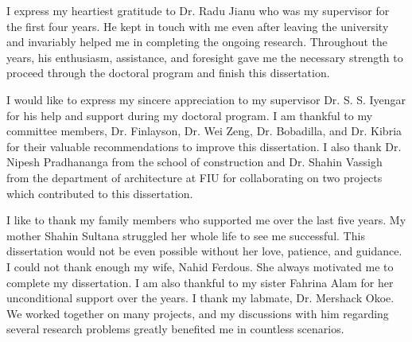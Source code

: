 \begin{acknowledgments}
I express my heartiest gratitude to Dr. Radu Jianu who was my supervisor for the first four years. He kept in touch with me even after leaving the university and invariably helped me in completing the ongoing research. Throughout the years, his enthusiasm, assistance, and foresight gave me the necessary strength to proceed through the doctoral program and finish this dissertation. 

I would like to express my sincere appreciation to my supervisor Dr.  S. S. Iyengar for his help and support during my doctoral program. I am thankful to my committee members, Dr. Finlayson, Dr. Wei Zeng, Dr. Bobadilla, and Dr. Kibria for their valuable recommendations to improve this dissertation. I also thank Dr. Nipesh Pradhananga from the school of construction and Dr. Shahin Vassigh from the department of architecture at FIU for collaborating on two projects which contributed to this dissertation.

I like to thank my family members who supported me over the last five years. My mother Shahin Sultana struggled her whole life to see me successful. This dissertation would not be even possible without her love, patience, and guidance.  I could not thank enough my wife, Nahid Ferdous. She always motivated me to complete my dissertation. I am also thankful to my sister Fahrina Alam for her unconditional support over the years.  I thank my labmate, Dr. Mershack Okoe. We worked together on many projects, and my discussions with him regarding several research problems greatly benefited me in countless scenarios. 
\end{acknowledgments}